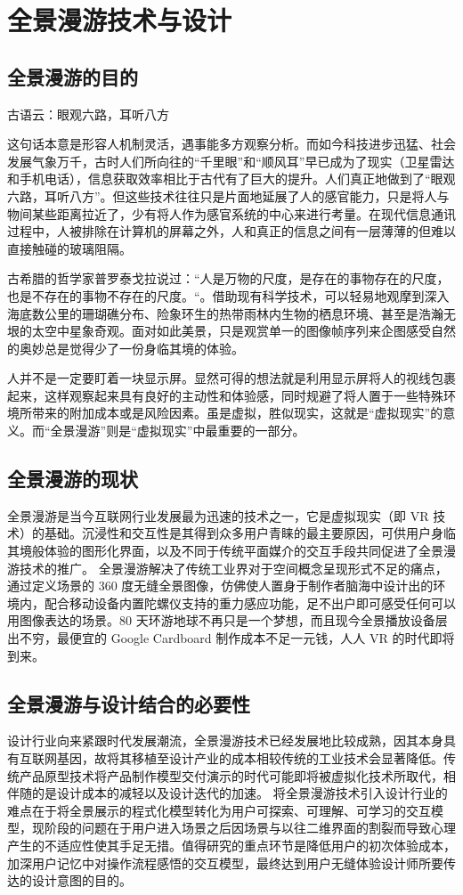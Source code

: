 \chapter{全景漫游技术与设计}
\section{全景漫游的目的}
古语云：眼观六路，耳听八方

这句话本意是形容人机制灵活，遇事能多方观察分析。而如今科技进步迅猛、社会发展气象万千，古时人们所向往的“千里眼”和“顺风耳”早已成为了现实（卫星雷达和手机电话），信息获取效率相比于古代有了巨大的提升。人们真正地做到了“眼观六路，耳听八方”。但这些技术往往只是片面地延展了人的感官能力，只是将人与物间某些距离拉近了，少有将人作为感官系统的中心来进行考量。在现代信息通讯过程中，人被排除在计算机的屏幕之外，人和真正的信息之间有一层薄薄的但难以直接触碰的玻璃阻隔。

古希腊的哲学家普罗泰戈拉说过：“人是万物的尺度，是存在的事物存在的尺度，也是不存在的事物不存在的尺度。“。借助现有科学技术，可以轻易地观摩到深入海底数公里的珊瑚礁分布、险象环生的热带雨林内生物的栖息环境、甚至是浩瀚无垠的太空中星象奇观。面对如此美景，只是观赏单一的图像帧序列来企图感受自然的奥妙总是觉得少了一份身临其境的体验。

人并不是一定要盯着一块显示屏。显然可得的想法就是利用显示屏将人的视线包裹起来，这样观察起来具有良好的主动性和体验感，同时规避了将人置于一些特殊环境所带来的附加成本或是风险因素。虽是虚拟，胜似现实，这就是“虚拟现实”的意义。而“全景漫游”则是“虚拟现实”中最重要的一部分。

\section{全景漫游的现状}
全景漫游是当今互联网行业发展最为迅速的技术之一，它是虚拟现实（即 VR 技术）的基础。沉浸性和交互性是其得到众多用户青睐的最主要原因，可供用户身临其境般体验的图形化界面，以及不同于传统平面媒介的交互手段共同促进了全景漫游技术的推广。
全景漫游解决了传统工业界对于空间概念呈现形式不足的痛点，通过定义场景的 360 度无缝全景图像，仿佛使人置身于制作者脑海中设计出的环境内，配合移动设备内置陀螺仪支持的重力感应功能，足不出户即可感受任何可以用图像表达的场景。80 天环游地球不再只是一个梦想，而且现今全景播放设备层出不穷，最便宜的 Google Cardboard 制作成本不足一元钱，人人 VR 的时代即将到来。

\section{全景漫游与设计结合的必要性}
设计行业向来紧跟时代发展潮流，全景漫游技术已经发展地比较成熟，因其本身具有互联网基因，故将其移植至设计产业的成本相较传统的工业技术会显著降低。传统产品原型技术将产品制作模型交付演示的时代可能即将被虚拟化技术所取代，相伴随的是设计成本的减轻以及设计迭代的加速。
将全景漫游技术引入设计行业的难点在于将全景展示的程式化模型转化为用户可探索、可理解、可学习的交互模型，现阶段的问题在于用户进入场景之后因场景与以往二维界面的割裂而导致心理产生的不适应性使其手足无措。值得研究的重点环节是降低用户的初次体验成本，加深用户记忆中对操作流程感悟的交互模型，最终达到用户无缝体验设计师所要传达的设计意图的目的。

